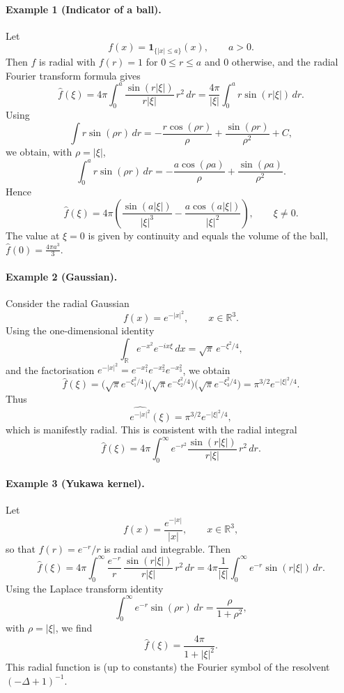\documentclass[12pt,a4paper]{article}
\theoremstyle{plain}
\theoremstyle{definition}
\theoremstyle{remark}
\theoremstyle{remark}
\begin{document}
\paragraph{Example 1 (Indicator of a ball).}
Let
\[
f(x) = \mathbf{1}_{\{|x|\le a\}}(x), \qquad a>0.
\]
Then $f$ is radial with $f(r)=1$ for $0\le r\le a$ and $0$ otherwise, and the
radial Fourier transform formula gives
\[
\widehat{f}(\xi)
=4\pi\int_0^a \frac{\sin(r|\xi|)}{r|\xi|}\,r^2\,dr
=\frac{4\pi}{|\xi|}\int_0^a r\sin(r|\xi|)\,dr.
\]
Using
\[
\int r\sin(\rho r)\,dr
= -\frac{r\cos(\rho r)}{\rho}
+\frac{\sin(\rho r)}{\rho^2} + C,
\]
we obtain, with $\rho=|\xi|$,
\[
\int_0^a r\sin(\rho r)\,dr
= -\frac{a\cos(\rho a)}{\rho}
+\frac{\sin(\rho a)}{\rho^2}.
\]
Hence
\[
\widehat{f}(\xi)
=4\pi\left(
\frac{\sin(a|\xi|)}{|\xi|^3}
-\frac{a\cos(a|\xi|)}{|\xi|^2}
\right),
\qquad \xi\neq 0.
\]
The value at $\xi=0$ is given by continuity and equals the volume of the ball,
$\widehat{f}(0)=\frac{4\pi a^3}{3}$.

\paragraph{Example 2 (Gaussian).}
Consider the radial Gaussian
\[
f(x)=e^{-|x|^2}, \qquad x\in\mathbb{R}^3.
\]
Using the one-dimensional identity
\[
\int_{\mathbb{R}} e^{-x^2} e^{-i x\xi}\,dx
= \sqrt{\pi}\,e^{-\xi^2/4},
\]
and the factorisation $e^{-|x|^2}=e^{-x_1^2}e^{-x_2^2}e^{-x_3^2}$, we obtain
\[
\widehat{f}(\xi)
= \bigl(\sqrt{\pi} e^{-\xi_1^2/4}\bigr)
\bigl(\sqrt{\pi} e^{-\xi_2^2/4}\bigr)
\bigl(\sqrt{\pi} e^{-\xi_3^2/4}\bigr)
= \pi^{3/2} e^{-|\xi|^2/4}.
\]
Thus
\[
\boxed{
	\widehat{e^{-|x|^2}}(\xi)
	= \pi^{3/2} e^{-|\xi|^2/4},
}
\]
which is manifestly radial. This is consistent with the radial integral
\[
\widehat{f}(\xi)
= 4\pi\int_0^\infty e^{-r^2}
\frac{\sin(r|\xi|)}{r|\xi|}\,r^2\,dr.
\]

\paragraph{Example 3 (Yukawa kernel).}
Let
\[
f(x) = \frac{e^{-|x|}}{|x|}, \qquad x\in\mathbb{R}^3,
\]
so that $f(r)=e^{-r}/r$ is radial and integrable. Then
\[
\widehat{f}(\xi)
= 4\pi\int_0^\infty \frac{e^{-r}}{r}\,
\frac{\sin(r|\xi|)}{r|\xi|}\,r^2\,dr
= 4\pi\frac{1}{|\xi|}
\int_0^\infty e^{-r}\sin(r|\xi|)\,dr.
\]
Using the Laplace transform identity
\[
\int_0^\infty e^{-r}\sin(\rho r)\,dr
= \frac{\rho}{1+\rho^2},
\]
with $\rho=|\xi|$, we find
\[
\widehat{f}(\xi)
= \frac{4\pi}{1+|\xi|^2}.
\]
This radial function is (up to constants) the Fourier symbol of the resolvent
$(-\Delta+1)^{-1}$.
\end{document}
